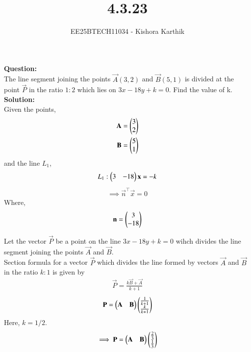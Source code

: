 \documentclass[journal]{IEEEtran}
\begin{document}

\vspace{1cm}

\title{4.3.23}
\author{EE25BTECH11034 - Kishora Karthik}
{\let\newpage\relax\maketitle}

\renewcommand{\thefigure}{\theenumi}
\renewcommand{\thetable}{\theenumi}
\textbf{Question:}\\
The line segment joining the points $\vec{A}(3,2)$ and $\vec{B}(5,1)$ is divided at the point $\vec{P}$ in the ratio $1:2$ which lies on $3x - 18y+k=0$. Find the value of k.\\

\textbf{Solution:}\\
Given the points,
\begin{align}
    \vec{A}=\begin{myvec}{3\\2}\end{myvec}\\ 
    \vec{B}=\begin{myvec}{5\\1}\end{myvec}
\end{align}
and the line $L_1$,
\begin{align}
    L_1: \begin{pmatrix}3 & -18\end{pmatrix}\mathbf{x} = -k
\end{align}
\begin{align}
    \implies \vec{n}^{\top}\vec{x}=0
\end{align}
Where,
\begin{align}
     \mathbf{n}=\begin{pmatrix}3\\-18\end{pmatrix}
\end{align}

\bigskip

Let the vector $\vec{P}$ be a point on the line $3x - 18y+k=0$ wihch divides the line segment joining the points $\vec{A}$ and $\vec{B}$.
\\
Section formula for a vector $\vec{P}$ which divides the line formed by vectors $\vec{A}$ and $\vec{B}$ in the ratio $k:1$ is given by
\begin{align}
    \vec{P}=\frac{k\vec{B}+\vec{A}}{k+1}
\end{align}
\begin{align}
    \mathbf{P}=\begin{pmatrix}\mathbf{A} & \mathbf{B}\end{pmatrix}\begin{pmatrix}\frac{1}{k+1}\\\frac{k}{k+1}\end{pmatrix}
\end{align}
Here, $k=1/2$.
\begin{align}
    \implies \mathbf{P}=\begin{pmatrix}\mathbf{A} & \mathbf{B}\end{pmatrix}\begin{pmatrix}\frac{2}{3}\\\frac{1}{3}\end{pmatrix}
\end{align}\\
\bigskip
\end{document}

